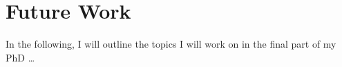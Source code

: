 
\chapter{Future Work}
\label{chap:future}

In the following, I will outline the topics I will work on in the final part of
my PhD \ldots